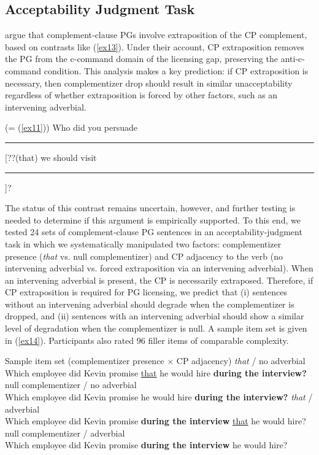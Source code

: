 \documentclass[12pt]{article}
\newcommand{\gap}{\rule{1.25em}{.5pt}} %
\begin{document}
\subsection{Acceptability Judgment Task}

\cite{arregi2022} argue that complement‑clause PGs involve extraposition of the CP complement, based on contrasts like (\ref{ex13}). Under their account, CP extraposition removes the PG from the c-command domain of the licensing gap, preserving the anti‑c-command condition. This analysis makes a key prediction: if CP extraposition is necessary, then complementizer drop should result in similar unacceptability regardless of whether extraposition is forced by other factors, such as an intervening adverbial.

\ex \label{ex13} (= (\ref{ex11}))
Who did you persuade \gap{} [??(that) we should visit \gap{}]?
\xe


The status of this contrast remains uncertain, however, and further testing is needed to determine if this argument is empirically supported. To this end, we tested 24 sets of complement‑clause PG sentences in an acceptability‑judgment task in which we systematically manipulated two factors: complementizer presence (\textit{that} vs. null complementizer) and CP adjacency to the verb (no intervening adverbial vs. forced extraposition via an intervening adverbial). When an intervening adverbial is present, the CP is necessarily extraposed. Therefore, if CP extraposition is required for PG licensing, we predict that (i) sentences without an intervening adverbial should degrade when the complementizer is dropped, and (ii) sentences with an intervening adverbial should show a similar level of degradation when the complementizer is null. A sample item set is given in (\ref{ex14}). Participants also rated 96 filler items of comparable complexity.

\pex \label{ex14} Sample item set (complementizer presence $\times$ CP adjacency)
\a \emph{that} / no adverbial \\
Which employee did Kevin promise \underline{that} he would hire \textbf{during the interview?}
\a null complementizer / no adverbial \\
Which employee did Kevin promise he would hire \textbf{during the interview?}
\a \emph{that} / adverbial \\
Which employee did Kevin promise \textbf{during the interview} \underline{that} he would hire?
\a null complementizer / adverbial \\
Which employee did Kevin promise \textbf{during the interview} he would hire?
\xe
\end{document}
